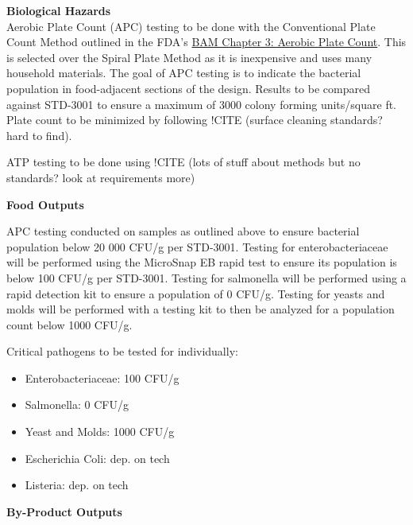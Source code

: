 \textbf{Biological Hazards}\\
Aerobic Plate Count (APC) testing to be done with the Conventional Plate Count Method outlined in the FDA's \href{https://www.fda.gov/food/laboratory-methods-food/bam-chapter-3-aerobic-plate-count}{BAM Chapter 3: Aerobic Plate Count}. This is selected over the Spiral Plate Method as it is inexpensive and uses many household materials. The goal of APC testing is to indicate the bacterial population in food-adjacent sections of the design. Results to be compared against STD-3001 to ensure a maximum of 3000 colony forming units/square ft. Plate count to be minimized by following !CITE (surface cleaning standards? hard to find). 

ATP testing to be done using !CITE (lots of stuff about methods but no standards? look at requirements more)

\textbf{Food Outputs}


APC testing conducted on samples as outlined above to ensure bacterial population below 20 000 CFU/g per STD-3001. Testing for enterobacteriaceae will be performed using the MicroSnap EB rapid test to ensure its population is below 100 CFU/g per STD-3001. Testing for salmonella will be performed using a rapid detection kit to ensure a population of 0 CFU/g.
 Testing for yeasts and molds will be performed with a testing kit to then be analyzed for a population count below 1000 CFU/g.

Critical pathogens to be tested for individually:
\begin{itemize}
    \item Enterobacteriaceae: 100 CFU/g
    \item Salmonella: 0 CFU/g
    \item Yeast and Molds: 1000 CFU/g
    \item Escherichia Coli: dep. on tech
    \item Listeria: dep. on tech
\end{itemize}


\textbf{By-Product Outputs}


